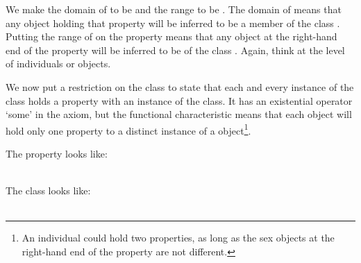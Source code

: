 We make the domain of  to be \person and the range to be . The domain of  \person means that any object holding that property will be inferred to be a member of the class \person. Putting the range of  on the  property means that any object at the right-hand end of the  property  will be inferred to be of the class . Again, think at the level of individuals or objects.

We now put a restriction on the \person class to state that each and every instance of the class \person holds a  property with an instance of the  class. It has an existential operator `some' in the axiom, but the functional characteristic means that each \person object will  hold only one  property to a distinct instance of a  object\footnote{An individual could hold two  properties, as long as the sex objects at the right-hand end of the property are not different.}.


The  property looks like: \\\\

The \person class looks like: \\\\

